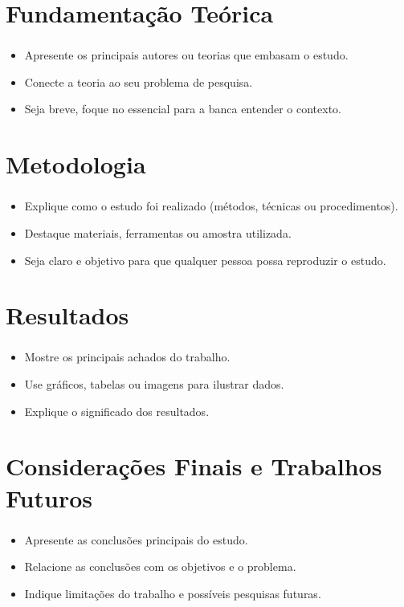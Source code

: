 \documentclass[aspectratio=169]{beamer}
\begin{document}
\section{Fundamentação Teórica}

\begin{frame}[fragile]
	\frametitle{\secname}
	\begin{itemize}
		\item Apresente os principais autores ou teorias que embasam o estudo.
		\item Conecte a teoria ao seu problema de pesquisa.
		\item Seja breve, foque no essencial para a banca entender o contexto.
	\end{itemize}
\end{frame}

\section{Metodologia}

\begin{frame}[fragile]
	\frametitle{\secname}
	\begin{itemize}
		\item Explique como o estudo foi realizado (métodos, técnicas ou procedimentos). 
		\item Destaque materiais, ferramentas ou amostra utilizada.
		\item Seja claro e objetivo para que qualquer pessoa possa reproduzir o estudo.
	\end{itemize}
\end{frame}

\section{Resultados}

\begin{frame}[fragile]
	\frametitle{\secname}
	\begin{itemize}
		\item Mostre os principais achados do trabalho.
		\item Use gráficos, tabelas ou imagens para ilustrar dados.
		\item Explique o significado dos resultados.
	\end{itemize}
\end{frame}

\section{Considerações Finais e Trabalhos Futuros}

\begin{frame}[fragile]
	\frametitle{\secname}
	\begin{itemize}
		\item Apresente as conclusões principais do estudo.
		\item Relacione as conclusões com os objetivos e o problema.
		\item Indique limitações do trabalho e possíveis pesquisas futuras.
	\end{itemize}
\end{frame}
\end{document}
